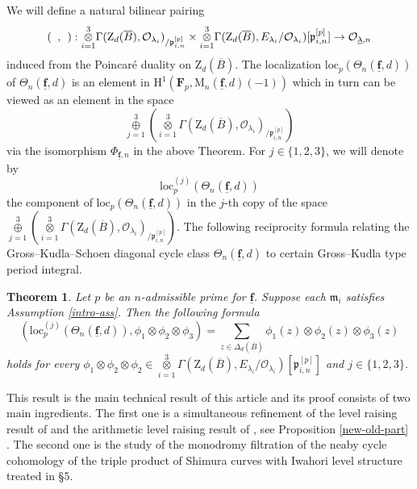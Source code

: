 \documentclass[10pt]{amsart}
\numberwithin{equation}{section}
\theoremstyle{plain}
\numberwithin{equation}{section}
\newtheorem{thm}{Theorem}
\theoremstyle{definition}
\theoremstyle{remark}
\def\loc{\mathrm{loc}}
\def\frakm{\mathfrak{m}}
\def\undlamb{\underline{\lambda}}
\def\triplef{\underline{\mathbf{f}}}
\def\threetensor{\overset{3}{\underset{i=1}\otimes}}
\def\threesum{\overset{3}{\underset{j=1}\oplus} }
\def\calO{\mathcal{O}}
\def\frakm{\mathfrak{m}}
\def\frakp{\mathfrak{p}}
\def\FF{\mathbf{F}}
\def\rmH{\mathrm{H}}
\def\rmM{\mathrm{M}}
\def\rmZ{\mathrm{Z}}
\begin{document}
We will define a natural bilinear pairing 
\begin{equation*}
 (\hphantom{a}, \hphantom{b}): \threetensor\Gamma(\rmZ_{d}(\overline{B}), \calO_{\lambda_{i}})_{/\frakp^{[p]}_{i, n}}\times  \threetensor\Gamma(\rmZ_{d}(\overline{B}), E_{\lambda_{i}}/\calO_{\lambda_{i}})[\frakp^{[p]}_{i, n}]\rightarrow \calO_{\undlamb, n}
\end{equation*}
induced from the Poincar\'e duality on $\rmZ_{d}(\overline{B})$. The localization $\loc_{p}(\Theta_{n}(\triplef, d))$ of $\Theta_{n}(\triplef, d)$ is an element in $\rmH^{1}(\FF_{p},  \rmM_{n}(\triplef,d)(-1))$ which in turn can be viewed as an element in the space 
\begin{equation*}
\threesum(\threetensor\Gamma(\rmZ_{d}(\overline{B}), \calO_{{\lambda_{i}}})_{/\frakp^{[p]}_{i, n}})
\end{equation*}
via the isomorphism $\Phi_{\triplef, n}$ in the above Theorem. For $j\in\{1, 2, 3\}$, we will denote by 
$$\loc^{(j)}_{p}(\Theta_{n}(\triplef,d))$$ 
the component of $\loc_{p}(\Theta_{n}(\triplef, d))$ in the $j$-th copy of the space 
$\threesum(\threetensor\Gamma(\rmZ_{d}(\overline{B}), \calO_{{\lambda_{i}}})_{/\frakp^{[p]}_{i, n}})$. The following  reciprocity formula relating the Gross--Kudla--Schoen diagonal cycle class $\Theta_{n}(\triplef, d)$ to certain {Gross--Kudla type period integral}. 

\begin{thm}\label{unram-intro}
Let $p$ be an $n$-admissible prime for $\triplef$. Suppose each $\frakm_{i}$ satisfies Assumption \ref{intro-ass}. Then the following formula
\begin{equation*}
(\loc^{(j)}_{p}(\Theta_{n}(\triplef,d)), \phi_{1}\otimes\phi_{2}\otimes\phi_{3})=\sum_{z\in \Delta_{d}(\overline{B})} \phi_{1}(z)\otimes \phi_{2}(z)\otimes \phi_{3}(z)
\end{equation*}
holds for every $\phi_{1}\otimes \phi_{2}\otimes \phi_{2}\in \threetensor\Gamma(\rmZ_{d}(\overline{B}), E_{\lambda_{i}}/\calO_{{\lambda_{i}}})[\frakp^{[p]}_{i, n}]$ and $j\in\{1, 2, 3\}$. 
\end{thm}

This result is the main technical result of this article and its proof consists of  two main ingredients. The first one is a simultaneous refinement of the level raising result of \cite{Ri-ICM} and the arithmetic level raising result of \cite{BD}, see Proposition \ref{new-old-part} . The second one is the study of the monodromy filtration of the neaby cycle cohomology of the triple product of Shimura curves with Iwahori level structure treated in \S $5$.
\end{document}
